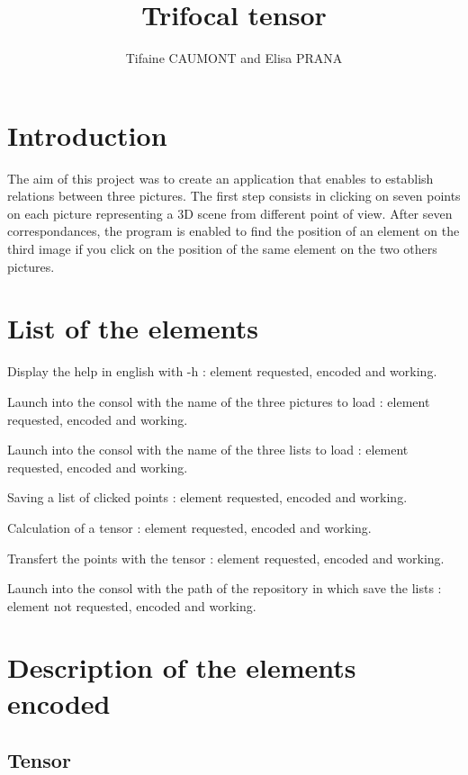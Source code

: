 \documentclass{report}
\begin{document}
\title{Trifocal tensor}
\author{Tifaine CAUMONT and Elisa PRANA}
\maketitle

\tableofcontents
\newpage

\section{Introduction}
The aim of this project was to create an application that enables to establish relations between three pictures. The first step consists in clicking on seven points on each picture representing a 3D scene from different point of view. After seven correspondances, the program is enabled to find the position of an element on the third image if you click on the position of the same element on the two others pictures. 

\section{List of the elements}
\begin{list}{•}{•}
\item 
Display the help in english with -h : element requested, encoded and working.  
\item
Launch into the consol with the name of the three pictures to load : element requested, encoded and working. 
\item
Launch into the consol with the name of the three lists to load : element requested, encoded and working. 
\item
Saving a list of clicked points : element requested, encoded and working.  
\item
Calculation of a tensor : element requested, encoded and working. 
\item
Transfert the points with the tensor : element requested, encoded and working.
\item 
Launch into the consol with the path of the repository in which save the lists : element not requested, encoded and working.  

\end{list}

\section{Description of the elements encoded}
\subsection{Tensor}
\end{document}
